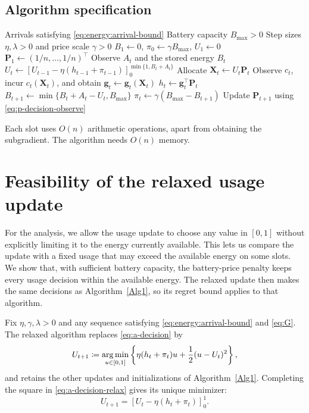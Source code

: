 \subsection{Algorithm specification}\label{section:alg-spec}

\begin{algorithm}
\caption{Energy usage, allocation proportions, and battery price}
\label{Alg1}
\begin{algorithmic}[1]
\Require Arrivals satisfying \eqref{eq:energy:arrival-bound}
\Require Battery capacity $B_{\mathrm{max}}>0$
\Require Step sizes $\eta,\lambda>0$ and price scale $\gamma>0$
\State $B_1\gets0$, $\pi_0\gets\gamma B_{\mathrm{max}}$,
       $U_1\gets 0$
\State $\mathbf P_1\gets(1/n,\ldots,1/n)^\top$
  \State Observe $A_t$ and the stored energy $B_t$
    \State $U_t\gets[U_{t-1}-\eta(h_{t-1}+\pi_{t-1})]
       _{0}^{\min\{1,B_t+A_t\}}$
  \EndIf
  \State Allocate $\mathbf X_t\gets U_t\mathbf P_t$
  \State Observe $c_t$, incur $c_t(\mathbf X_t)$, and obtain
         $\mathbf g_t\gets\mathbf g_t(\mathbf X_t)$
  \State $h_t\gets\mathbf g_t^\top\mathbf P_t$
  \State $B_{t+1}\gets\min\{B_t+A_t-U_t,B_{\mathrm{max}}\}$
  \State $\pi_t\gets\gamma(B_{\mathrm{max}}-B_{t+1})$
  \State Update $\mathbf P_{t+1}$ using \eqref{eq:p-decision-observe}
\EndFor
\end{algorithmic}
\end{algorithm}

Each slot uses $O(n)$ arithmetic operations, apart from obtaining the
subgradient. The algorithm needs $O(n)$ memory.

\section{Feasibility of the relaxed usage update}
\label{sec:energy:feasibility}

For the analysis, we allow the usage update to choose any value in $[0,1]$
without explicitly limiting it to the energy currently available. This
lets us compare the update with a fixed usage that may exceed the available
energy on some slots. We show that, with sufficient battery capacity, the
battery-price penalty keeps every usage decision within the available
energy. The relaxed update then makes the same decisions as
Algorithm~\ref{Alg1}, so its regret bound applies to that algorithm.

Fix $\eta,\gamma,\lambda>0$ and any sequence satisfying
\eqref{eq:energy:arrival-bound} and \eqref{eq:G}.
The relaxed algorithm replaces \eqref{eq:a-decision} by
\begin{equation}
\label{eq:a-decision-relax}
    U_{t+1}\coloneqq\operatorname*{arg\,min}_{u\in[0,1]}
    \left\{\eta(h_t+\pi_t)u+\frac12(u-U_t)^2\right\},
\end{equation}
and retains the other updates and initializations of Algorithm~\ref{Alg1}.
Completing the square in \eqref{eq:a-decision-relax} gives its unique minimizer:
\begin{equation}
\label{eq:relaxed-A}
    U_{t+1}=
    \left[U_t-\eta(h_t+\pi_t)\right]
    ^{1}_{0}.
\end{equation}
